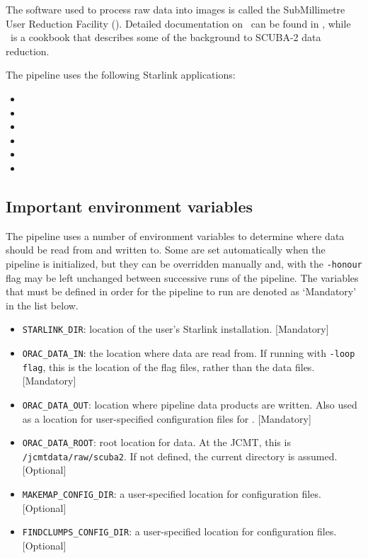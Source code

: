 The software used to process raw data into images is called the
SubMillimetre User Reduction Facility (\SMURF). Detailed documentation
on \SMURF\ can be found in \SMURFsun, while \SMURFcook\ is a cookbook
that describes some of the background to SCUBA-2 data reduction.

The pipeline uses the following Starlink applications:
\begin{itemize}
\item \SMURF
\item \KAPPA
\item \FLUXES
\item \FIGARO
\item \CCDPACK
\item \CUPID
\end{itemize}

\subsection{Important environment variables}

The pipeline uses a number of environment variables to determine where
data should be read from and written to. Some are set automatically
when the pipeline is initialized, but they can be overridden manually
and, with the \verb+-honour+ flag may be left unchanged between
successive runs of the pipeline. The variables that must be defined in
order for the pipeline to run are denoted as `Mandatory' in the list
below.

\begin{itemize}

\item \verb+STARLINK_DIR+: location of the user's Starlink
  installation. [Mandatory]

\item \verb+ORAC_DATA_IN+: the location where data are read from. If
  running with \verb+-loop flag+, this is the location of the flag
  files, rather than the data files. [Mandatory]

\item \verb+ORAC_DATA_OUT+: location where pipeline data products are
  written. Also used as a location for user-specified configuration
  files for . [Mandatory]

\item \verb+ORAC_DATA_ROOT+: root location for data. At the JCMT,
  this is \verb+/jcmtdata/raw/scuba2+. If not defined, the current
  directory is assumed. [Optional]

\item \verb+MAKEMAP_CONFIG_DIR+: a user-specified location for
   configuration files. [Optional]

\item \verb+FINDCLUMPS_CONFIG_DIR+: a user-specified location for
   configuration files. [Optional]

\end{itemize}


